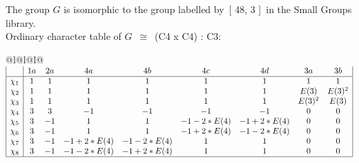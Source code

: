 \documentclass[varwidth=\maxdimen,border=10]{standalone}
\begin{document}
The group $G$ is isomorphic to the group labelled by\ [ 48, 3 ]\ in the Small Groups library.\\
Ordinary character table of $G$\ $\cong$\ (C4 x C4) : C3:\\
\begin{center}
\begin{tabular}{@{}l@{}l@{}l@{}}
\hline
\(\begin{array}{|l|cccccccc|}
  & 1a & 2a & 4a & 4b & 4c & 4d & 3a & 3b\\ \hline
\chi_{1} & 1 & 1 & 1 & 1 & 1 & 1 & 1 & 1\\
\chi_{2} & 1 & 1 & 1 & 1 & 1 & 1 & E(3) & E(3)^{2}\\
\chi_{3} & 1 & 1 & 1 & 1 & 1 & 1 & E(3)^{2} & E(3)\\
\chi_{4} & 3 & 3 & -1 & -1 & -1 & -1 & 0 & 0\\
\chi_{5} & 3 & -1 & 1 & 1 & -1-2*E(4) & -1+2*E(4) & 0 & 0\\
\chi_{6} & 3 & -1 & 1 & 1 & -1+2*E(4) & -1-2*E(4) & 0 & 0\\
\chi_{7} & 3 & -1 & -1+2*E(4) & -1-2*E(4) & 1 & 1 & 0 & 0\\
\chi_{8} & 3 & -1 & -1-2*E(4) & -1+2*E(4) & 1 & 1 & 0 & 0\\
\hline
\end{array}\)\\
\end{tabular}
\end{center}
\end{document}
